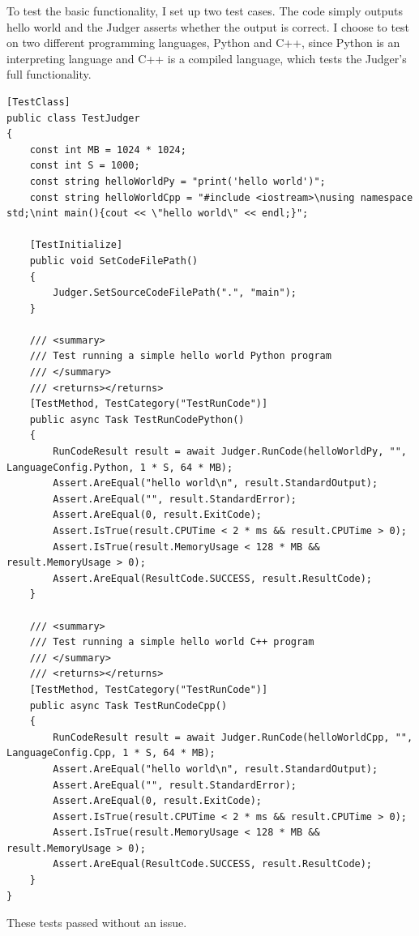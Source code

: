 \documentclass[a4paper]{report}
\begin{document}
To test the basic functionality, I set up two test cases. The code simply outputs hello world and the Judger asserts whether the output is correct. I choose to test on two different programming languages, Python and C++, since Python is an interpreting language and C++ is a compiled language, which tests the Judger's full functionality.

\begin{verbatim}
[TestClass]
public class TestJudger
{
    const int MB = 1024 * 1024;
    const int S = 1000;
    const string helloWorldPy = "print('hello world')";
    const string helloWorldCpp = "#include <iostream>\nusing namespace std;\nint main(){cout << \"hello world\" << endl;}";
    
    [TestInitialize]
    public void SetCodeFilePath()
    {
        Judger.SetSourceCodeFilePath(".", "main");
    }

    /// <summary>
    /// Test running a simple hello world Python program
    /// </summary>
    /// <returns></returns>
    [TestMethod, TestCategory("TestRunCode")]
    public async Task TestRunCodePython()
    {
        RunCodeResult result = await Judger.RunCode(helloWorldPy, "", LanguageConfig.Python, 1 * S, 64 * MB);
        Assert.AreEqual("hello world\n", result.StandardOutput);
        Assert.AreEqual("", result.StandardError);
        Assert.AreEqual(0, result.ExitCode);
        Assert.IsTrue(result.CPUTime < 2 * ms && result.CPUTime > 0);
        Assert.IsTrue(result.MemoryUsage < 128 * MB && result.MemoryUsage > 0);
        Assert.AreEqual(ResultCode.SUCCESS, result.ResultCode);
    }

    /// <summary>
    /// Test running a simple hello world C++ program
    /// </summary>
    /// <returns></returns>
    [TestMethod, TestCategory("TestRunCode")]
    public async Task TestRunCodeCpp()
    {
        RunCodeResult result = await Judger.RunCode(helloWorldCpp, "", LanguageConfig.Cpp, 1 * S, 64 * MB);
        Assert.AreEqual("hello world\n", result.StandardOutput);
        Assert.AreEqual("", result.StandardError);
        Assert.AreEqual(0, result.ExitCode);
        Assert.IsTrue(result.CPUTime < 2 * ms && result.CPUTime > 0);
        Assert.IsTrue(result.MemoryUsage < 128 * MB && result.MemoryUsage > 0);
        Assert.AreEqual(ResultCode.SUCCESS, result.ResultCode);
    }
}
\end{verbatim}

These tests passed without an issue.
\end{document}
